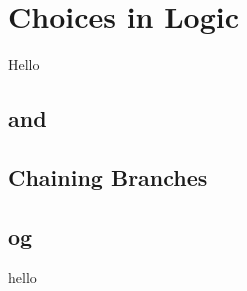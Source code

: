 \section{Choices in Logic}
\label{sec:flow:branch}

Hello

\subsection{ and }
\subsection{}
\subsection{Chaining Branches}
\subsection{ og }

\csharpsubsection{\csharp}
hello

